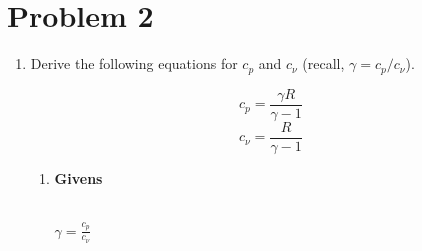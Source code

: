 \documentclass[12pt,letterpaper]{article}
\begin{document}
	\section*{Problem 2}
	\begin{enumerate}[label=(\alph*)]
		\item Derive the following equations for $c_p$ and $c_{\nu}$ (recall, $\gamma = c_p/c_{\nu}$).
		\begin{equation*}
			c_p = \frac{\gamma R}{\gamma - 1}
		\end{equation*}
		\begin{equation*}
			c_{\nu} = \frac{R}{\gamma-1}
		\end{equation*}
		
		\begin{enumerate}[label=\arabic*.]
			\item{\textbf{Givens}}
			\\
			$\gamma = \frac{c_p}{c_{\nu}}$


\end{enumerate}
\end{enumerate}
\end{document}
